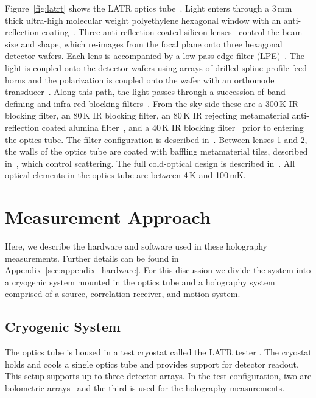 Figure~\ref{fig:latrt} shows the LATR optics tube~\cite{xu/etal:2020c}.  Light enters through a 3\,mm thick ultra-high molecular weight polyethylene hexagonal window with an anti-reflection coating~\cite{zhu18}.  Three anti-reflection coated silicon lenses~\cite{Datta:13,golec20} control the beam size and shape, which re-images from the focal plane onto three hexagonal detector wafers.  Each lens is accompanied by a low-pass edge filter (LPE)~\cite{10.1117/12.673162}.  The light is coupled onto the detector wafers using arrays of drilled spline profile feed horns and the polarization is coupled onto the wafer with an orthomode transducer~\cite{10.1117/12.2313405,2022arXiv220104507H}.  Along this path, the light passes through a succession of band-defining and infra-red blocking filters~\cite{10.1117/12.673162}.  From the sky side these are a 300\,K IR blocking filter, an 80\,K IR blocking filter, an 80\,K IR rejecting metamaterial anti-reflection coated alumina filter~\cite{golec20,golec2022}, and a 40\,K IR blocking filter~\cite{10.1117/12.2561720} prior to entering the optics tube.  The filter configuration is described in~\cite{zhu18}.  Between lenses 1 and 2, the walls of the optics tube are coated with baffling metamaterial tiles, described in~\cite{Xu:21}, which control scattering.  The full cold-optical design is described in~\cite{dicker2019cold}.  All optical elements in the optics tube are between 4\,K and 100\,mK. 

\section{Measurement Approach}
\label{sec:latot_meas_method}
Here, we describe the hardware and software used in these holography measurements.  Further details can be found in Appendix~\ref{sec:appendix_hardware}.  For this discussion we divide the system into a cryogenic system mounted in the optics tube and a holography system comprised of a source, correlation receiver, and motion system.

\subsection{Cryogenic System}
\label{sec:cryo_rec}
The optics tube is housed in a test cryostat called the LATR tester \cite{Harrington_2020}.  The cryostat holds and cools a single optics tube and provides support for detector readout.  This setup supports up to three detector arrays.   In the test configuration, two are bolometric arrays~\cite{2022arXiv220104507H} and the third is used for the holography measurements. 

